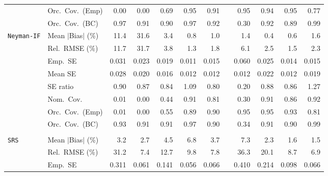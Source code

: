 \begin{landscape}
\begin{longtable}{llrrrrrrrrrr}
 & Orc.\ Cov.\ (Emp) & 0.00 & 0.00 & 0.69 & \cellcolor{rankone}0.95 & \cellcolor{rankthree}0.91 &  & \cellcolor{rankone}0.95 & \cellcolor{ranktwo}0.94 & \cellcolor{rankone}0.95 & 0.77 \\
 & Orc.\ Cov.\ (BC) & \cellcolor{rankone}0.97 & \cellcolor{rankthree}0.91 & 0.90 & \cellcolor{rankone}0.97 & \cellcolor{ranktwo}0.92 &  & 0.30 & \cellcolor{ranktwo}0.92 & 0.89 & \cellcolor{rankthree}0.99 \\
\addlinespace[2pt]
\quad \texttt{Neyman-IF} & Mean $|$Bias$|$ (\%) & 11.4 & 31.6 & 3.4 & \cellcolor{rankthree}0.8 & 1.0 &  & 1.4 & \cellcolor{rankone}0.4 & \cellcolor{ranktwo}0.6 & 1.6 \\
 & Rel.\ RMSE (\%) & 11.7 & 31.7 & 3.8 & \cellcolor{rankone}1.3 & \cellcolor{rankthree}1.8 &  & 6.1 & 2.5 & \cellcolor{ranktwo}1.5 & 2.3 \\
 & Emp.\ SE & 0.031 & 0.023 & 0.019 & 0.011 & 0.015 &  & 0.060 & 0.025 & 0.014 & 0.015 \\
 & Mean SE & 0.028 & 0.020 & 0.016 & 0.012 & 0.012 &  & 0.012 & 0.022 & 0.012 & 0.019 \\
 & SE ratio & \cellcolor{ranktwo}0.90 & 0.87 & 0.84 & \cellcolor{rankone}1.09 & 0.80 &  & 0.20 & \cellcolor{rankthree}0.88 & 0.86 & 1.27 \\
 & Nom.\ Cov. & 0.01 & 0.00 & 0.44 & \cellcolor{ranktwo}0.91 & 0.81 &  & 0.30 & \cellcolor{ranktwo}0.91 & \cellcolor{rankthree}0.86 & \cellcolor{rankone}0.92 \\
 & Orc.\ Cov.\ (Emp) & 0.01 & 0.00 & 0.55 & 0.89 & \cellcolor{rankthree}0.90 &  & \cellcolor{rankone}0.95 & \cellcolor{rankone}0.95 & \cellcolor{ranktwo}0.93 & 0.81 \\
 & Orc.\ Cov.\ (BC) & \cellcolor{rankone}0.93 & \cellcolor{ranktwo}0.91 & \cellcolor{ranktwo}0.91 & \cellcolor{rankone}0.97 & \cellcolor{rankthree}0.90 &  & 0.34 & \cellcolor{ranktwo}0.91 & \cellcolor{rankthree}0.90 & \cellcolor{ranktwo}0.99 \\
\addlinespace[2pt]
\multicolumn{12}{l}{\textbf{Binary \& Categorical Phase-One Covariates}} \\
\addlinespace[2pt]
\quad \texttt{SRS} & Mean $|$Bias$|$ (\%) & 3.2 & 2.7 & 4.5 & 6.8 & 3.7 &  & 7.3 & \cellcolor{rankthree}2.3 & \cellcolor{ranktwo}1.6 & \cellcolor{rankone}1.5 \\
 & Rel.\ RMSE (\%) & 31.2 & \cellcolor{ranktwo}7.4 & 12.7 & 9.8 & \cellcolor{rankthree}7.8 &  & 36.3 & 20.1 & 8.7 & \cellcolor{rankone}6.9 \\
 & Emp.\ SE & 0.311 & 0.061 & 0.141 & 0.056 & 0.066 &  & 0.410 & 0.214 & 0.098 & 0.066 \\

\end{longtable}
\end{landscape}
